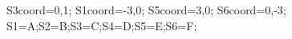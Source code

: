 \documentclass[exercice]{thedocument}%
\begin{document}
%
    \>S3coord={0,1};%
    \>S1coord={-3,0};%
    \>S5coord={3,0};%
    \>S6coord={0,-3};%
    \>S1=A;\>S2=B;\>S3=C;\>S4=D;\>S5=E;\>S6=F;%
\end{document}
